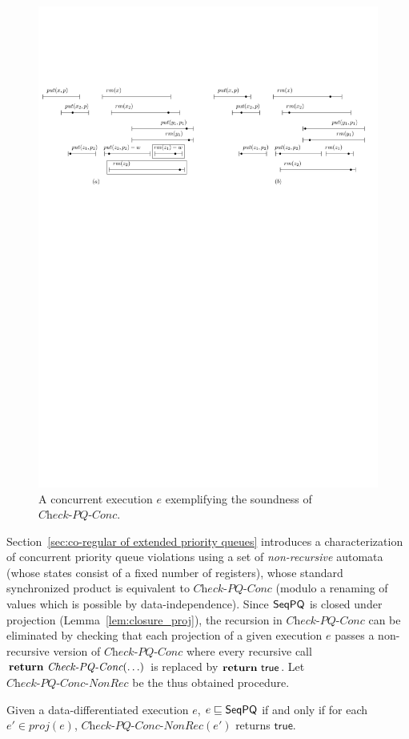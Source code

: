 \begin{figure}[t]
  \centering
  \includegraphics[width=.8\textwidth]{figures/PIC-HIS-EPQ1-TwoHis-2.pdf}
  \caption{A concurrent execution $e$ exemplifying the soundness of $\textit{Check-PQ-Conc}$.}
  \label{fig:concurrent execution for EPQ1}
\end{figure}




Section~\ref{sec:co-regular of extended priority queues} introduces a characterization of concurrent priority queue violations using a set of \emph{non-recursive} automata (whose states consist of a fixed number of registers), whose standard synchronized product is equivalent to $\textit{Check-PQ-Conc}$ (modulo a renaming of values which is possible by data-independence). Since $\mathsf{SeqPQ}$ is closed under projection (Lemma~\ref{lem:closure_proj}), the recursion in $\textit{Check-PQ-Conc}$ can be eliminated by checking that each projection of a given execution $e$ passes a non-recursive version of $\textit{Check-PQ-Conc}$ where every recursive call $\text{{\bf return}}\ \textit{Check-PQ-Conc}(\ldots)$ is
replaced by  $\text{{\bf return}}\ \mathsf{true}$. Let $\textit{Check-PQ-Conc-NonRec}$ be the thus obtained procedure.

\begin{lemma}
\label{lemma:EPQ as multi in MRpri for history}
Given a data-differentiated execution $e$, $e \sqsubseteq \mathsf{SeqPQ}$ if and only if for each $e' \in \textit{proj}(e)$, $\textit{Check-PQ-Conc-NonRec}(e')$ returns $\mathsf{true}$.
\end{lemma}